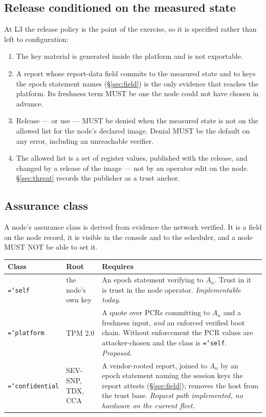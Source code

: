 \documentclass[11pt,a4paper]{article}
\newcommand{\code}[1]{\texttt{\hyphenchar\font=`\-\relax #1}}
\begin{document}
\subsection{Release conditioned on the measured state}

At L3 the release policy is the point of the exercise, so it is specified rather
than left to configuration:

\begin{enumerate}[label=\textbf{G\arabic*.},leftmargin=2.6em]
\item The key material is generated inside the platform and is not exportable.
\item A report whose report-data field commits to the measured state and to keys
  the epoch statement names (\S\ref{sec:field}) is the only evidence that reaches
  the platform. Its freshness term MUST be one the node could not have chosen in
  advance.
\item Release --- or use --- MUST be denied when the measured state is not on the
  allowed list for the node's declared image. Denial MUST be the default on any
  error, including an unreachable verifier.
\item The allowed list is a set of register values, published with the release,
  and changed by a release of the image --- not by an operator edit on the node.
  \S\ref{sec:threat} records the publisher as a trust anchor.
\end{enumerate}

\subsection{Assurance class}
\label{sec:class}

A node's assurance class is derived from evidence the network verified. It is a
field on the node record, it is visible in the console and to the scheduler, and a
node MUST NOT be able to set it.

\begin{center}
\small
\begin{tabular}{@{}l>{\raggedright\arraybackslash}p{}>{\raggedright\arraybackslash}p{}@{}}
\toprule
\textbf{Class} & \textbf{Root} & \textbf{Requires} \\
\midrule
\code{self} & the node's own key &
An epoch statement verifying to $A_n$. Trust in it is trust in the node operator.
\emph{Implementable today.} \\[3pt]
\code{platform} & TPM 2.0 &
A quote over PCRs committing to $A_n$ and a freshness input, \emph{and} an
enforced verified boot chain. Without enforcement the PCR values are
attacker-chosen and the class is \code{self}. \emph{Proposed.} \\[3pt]
\code{confidential} & SEV-SNP, TDX, CCA &
A vendor-rooted report, joined to $A_n$ by an epoch statement naming the session
keys the report attests (\S\ref{sec:field}); removes the host from the trust base.
\emph{Request path implemented, no hardware on the current fleet.} \\
\bottomrule
\end{tabular}
\end{center}
\end{document}
